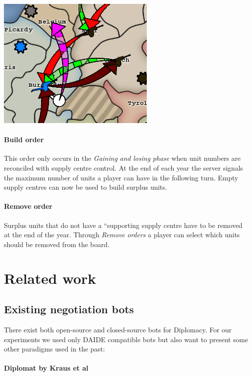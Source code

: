 \documentclass[pdftex,11pt,a4paper]{report}
\begin{document}
\includegraphics[scale=0.75]{./screenshots/ImmRetreat0.png} \\[1cm] 

\paragraph{Build order}
This order only occurs in the \textit{Gaining and losing phase} when
unit numbers are reconciled with supply centre control. At the end of
each year the server signals the maximum number of units a player can
have in the following turn. Empty supply centres can now be used to
build surplus units.

\paragraph{Remove order}
Surplus units that do not have a ``supporting supply centre have
to be removed at the end of the year. Through \textit{Remove orders} a
player can select which units should be removed from the board.


\pagebreak

\section{Related work}

\subsection{Existing negotiation bots}

There exist both open-source and closed-source
bots for Diplomacy. For our experiments we used only DAIDE
compatible bots but also want to present some other 
paradigms used in the past:

\paragraph{Diplomat by Kraus et al}
\end{document}
